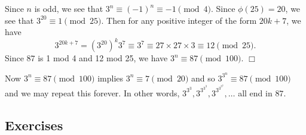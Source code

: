 \documentclass{article}
\newenvironment{proof}{\noindent {\bf Proof:}}{$\Box$ \vspace{2 ex}}
\begin{document}
\begin{proof}
    Since $n$ is odd, we see that $3^n\equiv (-1)^n \equiv -1\pmod{4}$. Since $\phi(25) = 20$, we see that $3^{20}\equiv 1\pmod{25}$. Then for any positive integer of the form $20k+7$, we have
    $$3^{20k+7} = (3^{20})^k3^7\equiv 3^7 \equiv 27 \times 27 \times 3 \equiv 12\pmod{25}.$$
    Since $87$ is 1 mod 4 and 12 mod 25, we have $3^n\equiv 87\pmod{100}$.
\end{proof}

Now $3^n\equiv 87\pmod{100}$ implies $3^n\equiv 7\pmod{20}$ and so $3^{3^n}\equiv 87\pmod{100}$ and we may repeat this forever. In other words, $3^{3^3}, 3^{3^{3^3}}, 3^{3^{3^{3^3}}},\ldots$ all end in $87$.

\subsection*{Exercises}
\end{document}
